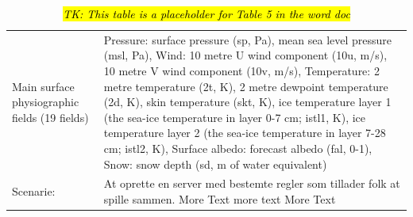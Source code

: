 \documentclass[hess, manuscript]{copernicus}
\begin{document}
\begin{table}[h]
	\begin{tabularx}{\textwidth}{lX}
		\hline
		Main surface physiographic fields
		(19 fields)          & Pressure: surface pressure (sp, Pa), mean sea level pressure (msl, Pa), 
		Wind: 10 metre U wind component (10u, m/s), 10 metre V wind component (10v, m/s), 
		Temperature: 2 metre temperature (2t, K), 2 metre dewpoint temperature (2d, K), skin temperature (skt, K), ice temperature layer 1 (the sea-ice temperature in layer 0-7 cm; istl1, K), ice temperature layer 2 (the sea-ice temperature in layer 7-28 cm; istl2, K), 
		Surface albedo: forecast albedo (fal, 0-1), 
		Snow: snow depth (sd, m of water equivalent)
		
		\\
		Scenarie:               & At oprette en server med bestemte regler som tillader folk at spille sammen. More Text more text More Text \\
		\hline
	\end{tabularx}
	\caption{\hl{\textit{TK: This table is a placeholder for Table 5 in the word doc}}}
\end{table}
\end{document}
